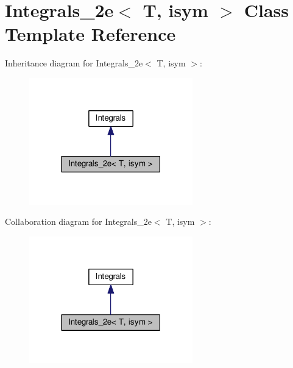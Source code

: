 \hypertarget{classIntegrals__2e}{}\section{Integrals\+\_\+2e$<$ T, isym $>$ Class Template Reference}
\label{classIntegrals__2e}


Inheritance diagram for Integrals\+\_\+2e$<$ T, isym $>$\+:\nopagebreak
\begin{figure}[H]
\begin{center}
\leavevmode
\includegraphics[width=201pt]{classIntegrals__2e__inherit__graph}
\end{center}
\end{figure}


Collaboration diagram for Integrals\+\_\+2e$<$ T, isym $>$\+:\nopagebreak
\begin{figure}[H]
\begin{center}
\leavevmode
\includegraphics[width=201pt]{classIntegrals__2e__coll__graph}
\end{center}
\end{figure}

